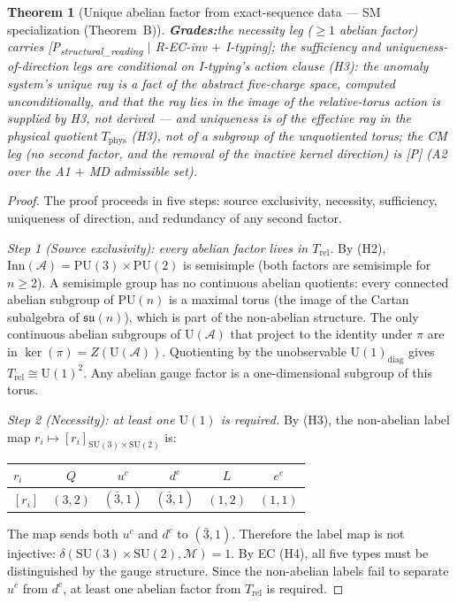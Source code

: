 \documentclass[11pt]{article}
\newtheorem{theorem}{Theorem}[section]
\theoremstyle{definition}
\newcommand{\SU}{\mathrm{SU}}
\newcommand{\U}{\mathrm{U}}
\begin{document}
\begin{theorem}[Unique abelian factor from exact-sequence data ---
SM specialization (Theorem~B)]
\smallskip\noindent\textbf{Grades:}\quad the necessity leg ($\ge 1$
abelian factor) carries
[P\textsubscript{structural\_reading} $\mid$ R-EC-inv $+$ I-typing];
the sufficiency and uniqueness-of-direction legs are conditional on
I-typing's action clause (H3): the anomaly system's unique ray is a
fact of the abstract five-charge space, computed unconditionally, and
that the ray lies in the image of the relative-torus action is
supplied by H3, not derived --- and uniqueness is of the effective
ray in the physical quotient $T_{\mathrm{phys}}$ (H3), not of a
subgroup of the unquotiented torus; the CM leg (no second factor,
and the removal of the inactive kernel direction) is [P]
(A2 over the A1 $+$ MD admissible set).
\end{theorem}

\begin{proof}
The proof proceeds in five steps: source exclusivity, necessity,
sufficiency, uniqueness of direction, and redundancy of any second
factor.

\textit{Step 1 (Source exclusivity): every abelian factor lives in
$T_{\mathrm{rel}}$.}\quad
By (H2), $\mathrm{Inn}(\mathcal{A}) = \mathrm{PU}(3) \times
\mathrm{PU}(2)$ is semisimple (both factors are semisimple for
$n \ge 2$).  A semisimple group has no continuous abelian
quotients: every connected abelian subgroup of $\mathrm{PU}(n)$ is
a maximal torus (the image of the Cartan subalgebra of
$\mathfrak{su}(n)$), which is part of the non-abelian structure.
The only continuous abelian subgroups of $\mathrm{U}(\mathcal{A})$
that project to the identity under $\pi$ are in $\ker(\pi) =
Z(\mathrm{U}(\mathcal{A}))$.  Quotienting by the unobservable
$\mathrm{U}(1)_{\mathrm{diag}}$ gives $T_{\mathrm{rel}} \cong
\mathrm{U}(1)^2$.  Any abelian gauge factor is a one-dimensional
subgroup of this torus.

\textit{Step 2 (Necessity): at least one $\U(1)$ is required.}\quad
By (H3), the non-abelian label map
$r_i \mapsto [r_i]_{\SU(3) \times \SU(2)}$ is:
\begin{center}\small
\begin{tabular}{@{}lccccc@{}}
\toprule
$r_i$ & $Q$ & $u^c$ & $d^c$ & $L$ & $e^c$ \\
\midrule
$[r_i]$ & $(3,2)$ & $(\bar{3},1)$ & $(\bar{3},1)$ & $(1,2)$ & $(1,1)$ \\
\bottomrule
\end{tabular}
\end{center}
The map sends both $u^c$ and $d^c$ to $(\bar{3}, 1)$.  Therefore
the label map is not injective: $\delta(\SU(3) \times \SU(2),
\mathcal{M}) = 1$.  By EC (H4), all five types must be
distinguished by the gauge structure.  Since the non-abelian
labels fail to separate $u^c$ from $d^c$, at least one abelian
factor from $T_{\mathrm{rel}}$ is required.


\end{proof}
\end{document}
